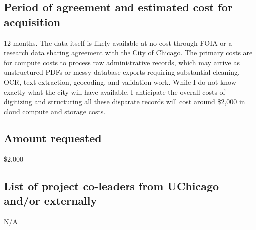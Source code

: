 \documentclass[12pt]{article}
\begin{document}
\subsection*{Period of agreement and estimated cost for acquisition}

12 months. The data itself is likely available at no cost through FOIA or a research data sharing agreement with the City of Chicago. 
The primary costs are for compute costs to process raw administrative records, which may arrive as unstructured PDFs or messy database exports requiring substantial cleaning, OCR, text extraction, geocoding, and validation work. While I do not know exactly what the city will have available, I anticipate the overall costs of digitizing and structuring all these disparate records will cost around \$2,000 in cloud compute and storage costs.

\subsection*{Amount requested}

\$2,000

\subsection*{List of project co-leaders from UChicago and/or externally}

N/A
\end{document}
